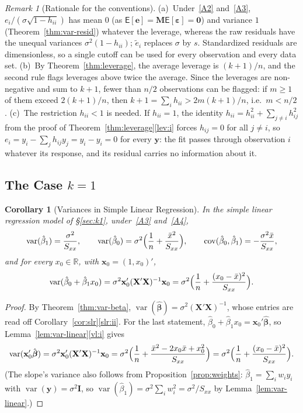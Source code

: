\documentclass[14pt]{extarticle}
\theoremstyle{plain}
\newtheorem{corollary}[theorem]{Corollary}
\theoremstyle{definition}
\theoremstyle{remark}
\newtheorem{remark}[theorem]{Remark}
\newcommand\expc{\mathsf{E}}
\DeclareMathOperator\var{var}
\DeclareMathOperator\cov{cov}
\newcommand{\bX}{\mathbf{X}}
\newcommand{\by}{\mathbf{y}}
\newcommand{\bx}{\mathbf{x}}
\def\bb{\boldsymbol{\beta}}
\newcommand{\be}{\boldsymbol{\varepsilon}}
\newcommand{\bI}{\mathbf{I}}
\newcommand{\bM}{\mathbf{M}}
\newcommand{\bzero}{\mathbf{0}}
\newcommand{\Real}{\mathbb{R}}
\begin{document}
\begin{remark}[Rationale for the conventions]\label{rem:std-resid}
(a)~Under~\ref{A2} and~\ref{A3}, $e_i/(\sigma\sqrt{1 - h_{ii}})$ has mean $0$ (as $\expc[\mathbf{e}] = \bM\expc[\be] = \bzero$) and variance $1$ (Theorem~\ref{thm:var-resid}) whatever the leverage, whereas the raw residuals have the unequal variances $\sigma^2(1 - h_{ii})$; $\tilde e_i$ replaces $\sigma$ by $s$. Standardized residuals are dimensionless, so a single cutoff can be used for every observation and every data set. (b)~By Theorem~\ref{thm:leverage}, the average leverage is $(k+1)/n$, and the second rule flags leverages above twice the average. Since the leverages are non-negative and sum to $k + 1$, fewer than $n/2$ observations can be flagged: if $m \geqslant 1$ of them exceed $2(k+1)/n$, then $k + 1 = \sum_i h_{ii} > 2m(k+1)/n$, i.e.\ $m < n/2$. (c)~The restriction $h_{ii} < 1$ is needed. If $h_{ii} = 1$, the identity $h_{ii} = h_{ii}^2 + \sum_{j \neq i}h_{ij}^2$ from the proof of Theorem~\ref{thm:leverage}\ref{lev:i} forces $h_{ij} = 0$ for all $j \neq i$, so $e_i = y_i - \sum_j h_{ij}y_j = y_i - y_i = 0$ for every $\by$: the fit passes through observation $i$ whatever its response, and its residual carries no information about it.
\end{remark}

\subsection{The Case \texorpdfstring{$k = 1$}{k = 1}}

\begin{corollary}[Variances in Simple Linear Regression]\label{cor:slr-var}
In the simple linear regression model of \S\ref{sec:k1}, under~\ref{A3} and~\ref{A4},
\[
\var(\hat\beta_1) = \frac{\sigma^2}{S_{xx}}, \qquad \var(\hat\beta_0) = \sigma^2\Bigl(\frac{1}{n} + \frac{\bar x^2}{S_{xx}}\Bigr), \qquad \cov(\hat\beta_0, \hat\beta_1) = -\frac{\sigma^2\bar x}{S_{xx}},
\]
and for every $x_0 \in \Real$, with $\bx_0 = (1, x_0)'$,
\[
\var(\hat\beta_0 + \hat\beta_1x_0) = \sigma^2\bx_0'(\bX'\bX)^{-1}\bx_0 = \sigma^2\Bigl(\frac{1}{n} + \frac{(x_0 - \bar x)^2}{S_{xx}}\Bigr).
\]
\end{corollary}

\begin{proof}
By Theorem~\ref{thm:var-beta}, $\var(\hat{\bb}) = \sigma^2(\bX'\bX)^{-1}$, whose entries are read off Corollary~\ref{cor:slr}\ref{slr:ii}. For the last statement, $\hat\beta_0 + \hat\beta_1x_0 = \bx_0'\hat{\bb}$, so Lemma~\ref{lem:var-linear}\ref{vl:i} gives
\[
\var(\bx_0'\hat{\bb}) = \sigma^2\bx_0'(\bX'\bX)^{-1}\bx_0 = \sigma^2\Bigl(\frac{1}{n} + \frac{\bar x^2 - 2x_0\bar x + x_0^2}{S_{xx}}\Bigr) = \sigma^2\Bigl(\frac{1}{n} + \frac{(x_0 - \bar x)^2}{S_{xx}}\Bigr).
\]
(The slope's variance also follows from Proposition~\ref{prop:weights}: $\hat\beta_1 = \sum_i w_iy_i$ with $\var(\by) = \sigma^2\bI$, so $\var(\hat\beta_1) = \sigma^2\sum_i w_i^2 = \sigma^2/S_{xx}$ by Lemma~\ref{lem:var-linear}.)
\end{proof}
\end{document}
